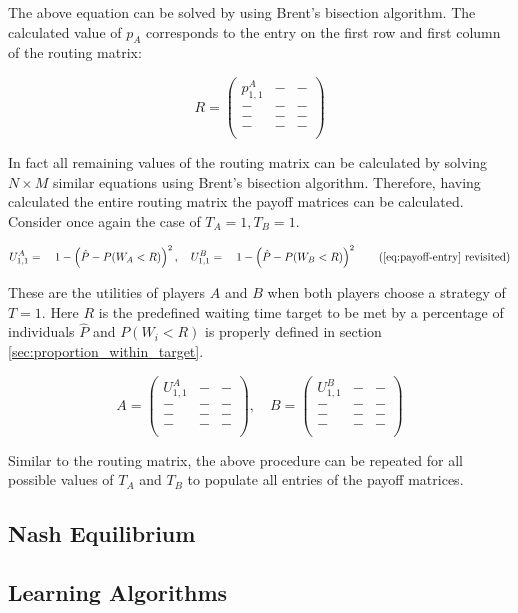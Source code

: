 The above equation can be solved by using Brent's bisection algorithm.
The calculated value of \(p_A\) corresponds to the entry on the first row and 
first column of the routing matrix:

\begin{equation}\label{eq:routing_matrix_1_1}
    R = 
    \begin{pmatrix}
        p_{1,1}^A & - & - \\
        - & - & - \\
        - & - & - \\
        - & - & - \\
    \end{pmatrix}
\end{equation}

In fact all remaining values of the routing matrix can be calculated by
solving \(N \times M\) similar equations using Brent's bisection algorithm.
Therefore, having calculated the entire routing matrix the payoff matrices can
be calculated.
Consider once again the case of \(T_A=1, T_B=1\). 

\begin{equation*}
    U_{1, 1}^A = \quad 1 -\left( 
        \hat{P} - P(W_A < R) 
    \right)^2,
    \quad
    U_{1, 1}^B = \quad 1 -\left( 
        \hat{P} - P(W_B < R) 
    \right)^2 \tag{\ref{eq:payoff-entry} revisited}
\end{equation*}

These are the utilities of players \(A\) and \(B\) when both players choose a
strategy of \(T = 1\).
Here \(R\) is the predefined waiting time target to be met by a percentage of 
individuals \( \hat{P} \) and \(P(W_i < R)\) is properly defined in section
\ref{sec:proportion_within_target}.

\begin{equation}\label{eq:payoff_matrices_1_1}
    A = 
    \begin{pmatrix}
        U_{1, 1}^A & - & - \\
        - & - & - \\
        - & - & - \\
        - & - & - \\
    \end{pmatrix}, \quad
    B = 
    \begin{pmatrix}
        U_{1, 1}^B & - & - \\
        - & - & - \\
        - & - & - \\
        - & - & - \\
    \end{pmatrix}
\end{equation}

Similar to the routing matrix, the above procedure can be repeated for all 
possible values of \(T_A\) and \(T_B\) to populate all entries of the payoff 
matrices. 


\subsection{Nash Equilibrium}

\subsection{Learning Algorithms}
